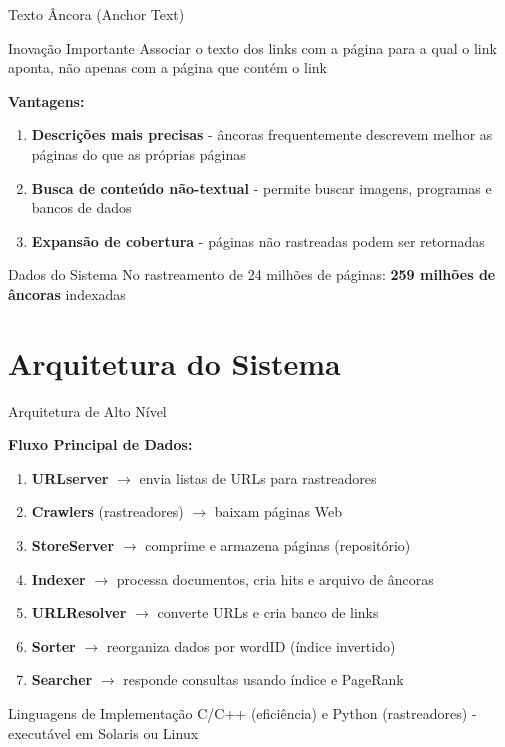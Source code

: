 \documentclass[aspectratio=169]{beamer}
\begin{document}
\begin{frame}{Texto Âncora (Anchor Text)}
\begin{block}{Inovação Importante}
Associar o texto dos links com a página para a qual o link aponta, não apenas com a página que contém o link
\end{block}

\vspace{0.3cm}
\textbf{Vantagens:}
\begin{enumerate}
\item \textbf{Descrições mais precisas} - âncoras frequentemente descrevem melhor as páginas do que as próprias páginas
\item \textbf{Busca de conteúdo não-textual} - permite buscar imagens, programas e bancos de dados
\item \textbf{Expansão de cobertura} - páginas não rastreadas podem ser retornadas
\end{enumerate}

\vspace{0.3cm}
\begin{exampleblock}{Dados do Sistema}
No rastreamento de 24 milhões de páginas: \textbf{259 milhões de âncoras} indexadas
\end{exampleblock}
\end{frame}

\section{Arquitetura do Sistema}

\begin{frame}{Arquitetura de Alto Nível}
\begin{center}
\textbf{Fluxo Principal de Dados:}
\end{center}

\begin{enumerate}
\item \textbf{URLserver} $\rightarrow$ envia listas de URLs para rastreadores
\item \textbf{Crawlers} (rastreadores) $\rightarrow$ baixam páginas Web
\item \textbf{StoreServer} $\rightarrow$ comprime e armazena páginas (repositório)
\item \textbf{Indexer} $\rightarrow$ processa documentos, cria hits e arquivo de âncoras
\item \textbf{URLResolver} $\rightarrow$ converte URLs e cria banco de links
\item \textbf{Sorter} $\rightarrow$ reorganiza dados por wordID (índice invertido)
\item \textbf{Searcher} $\rightarrow$ responde consultas usando índice e PageRank
\end{enumerate}

\vspace{0.3cm}
\begin{block}{Linguagens de Implementação}
C/C++ (eficiência) e Python (rastreadores) - executável em Solaris ou Linux
\end{block}
\end{frame}
\end{document}

